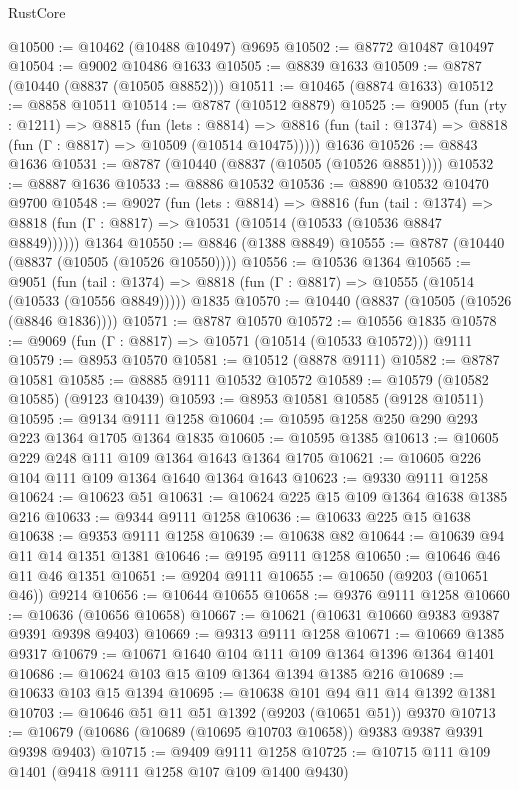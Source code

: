 \begin{lexlean}{RustCore}
\begin{coremodule}
@10500 := @10462 (@10488 @10497) @9695
@10502 := @8772 @10487 @10497
@10504 := @9002 @10486 @1633
@10505 := @8839 @1633
@10509 := @8787 (@10440 (@8837 (@10505 @8852)))
@10511 := @10465 (@8874 @1633)
@10512 := @8858 @10511
@10514 := @8787 (@10512 @8879)
@10525 := @9005
    (fun (rty : @1211) =>
    @8815
      (fun (lets : @8814) =>
      @8816 (fun (tail : @1374) => @8818 (fun (Γ : @8817) => @10509 (@10514 @10475)))))
    @1636
@10526 := @8843 @1636
@10531 := @8787 (@10440 (@8837 (@10505 (@10526 @8851))))
@10532 := @8887 @1636
@10533 := @8886 @10532
@10536 := @8890 @10532 @10470 @9700
@10548 := @9027
    (fun (lets : @8814) =>
    @8816
      (fun (tail : @1374) =>
      @8818 (fun (Γ : @8817) => @10531 (@10514 (@10533 (@10536 @8847 @8849))))))
    @1364
@10550 := @8846 (@1388 @8849)
@10555 := @8787 (@10440 (@8837 (@10505 (@10526 @10550))))
@10556 := @10536 @1364
@10565 := @9051
    (fun (tail : @1374) => @8818 (fun (Γ : @8817) => @10555 (@10514 (@10533 (@10556 @8849)))))
    @1835
@10570 := @10440 (@8837 (@10505 (@10526 (@8846 @1836))))
@10571 := @8787 @10570
@10572 := @10556 @1835
@10578 := @9069 (fun (Γ : @8817) => @10571 (@10514 (@10533 @10572))) @9111
@10579 := @8953 @10570
@10581 := @10512 (@8878 @9111)
@10582 := @8787 @10581
@10585 := @8885 @9111 @10532 @10572
@10589 := @10579 (@10582 @10585) (@9123 @10439)
@10593 := @8953 @10581 @10585 (@9128 @10511)
@10595 := @9134 @9111 @1258
@10604 := @10595 @1258 @250 @290 @293 @223 @1364 @1705 @1364 @1835
@10605 := @10595 @1385
@10613 := @10605 @229 @248 @111 @109 @1364 @1643 @1364 @1705
@10621 := @10605 @226 @104 @111 @109 @1364 @1640 @1364 @1643
@10623 := @9330 @9111 @1258
@10624 := @10623 @51
@10631 := @10624 @225 @15 @109 @1364 @1638 @1385 @216
@10633 := @9344 @9111 @1258
@10636 := @10633 @225 @15 @1638
@10638 := @9353 @9111 @1258
@10639 := @10638 @82
@10644 := @10639 @94 @11 @14 @1351 @1381
@10646 := @9195 @9111 @1258
@10650 := @10646 @46 @11 @46 @1351
@10651 := @9204 @9111
@10655 := @10650 (@9203 (@10651 @46)) @9214
@10656 := @10644 @10655
@10658 := @9376 @9111 @1258
@10660 := @10636 (@10656 @10658)
@10667 := @10621 (@10631 @10660 @9383 @9387 @9391 @9398 @9403)
@10669 := @9313 @9111 @1258
@10671 := @10669 @1385 @9317
@10679 := @10671 @1640 @104 @111 @109 @1364 @1396 @1364 @1401
@10686 := @10624 @103 @15 @109 @1364 @1394 @1385 @216
@10689 := @10633 @103 @15 @1394
@10695 := @10638 @101 @94 @11 @14 @1392 @1381
@10703 := @10646 @51 @11 @51 @1392 (@9203 (@10651 @51)) @9370
@10713 := @10679 (@10686 (@10689 (@10695 @10703 @10658)) @9383 @9387 @9391 @9398 @9403)
@10715 := @9409 @9111 @1258
@10725 := @10715 @111 @109 @1401 (@9418 @9111 @1258 @107 @109 @1400 @9430)

\end{coremodule}
\end{lexlean}
